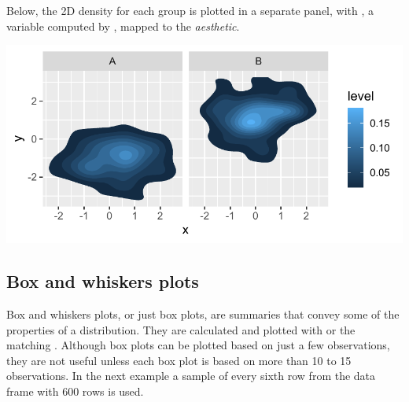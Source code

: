 \documentclass[krantz2]{krantz}\usepackage{knitr}
\begin{document}
Below, the 2D density for each group is plotted in a separate panel, with , a variable computed by , mapped to the  \emph{aesthetic}.



\begin{knitrout}\footnotesize
{}\color{fgcolor}\begin{kframe}
\begin{alltt}
\hlstd{(} 
        \hlstd{=} \hlstd{(}    \hlopt{+}
  \hlstd{(}\hlstd{(} \hlstd{=}   \hlstd{=} \hlstd{)} \hlopt{+}
  \hlstd{(} \hlstd{=} 
\end{alltt}
\end{kframe}

{\centering \includegraphics[width=.7\textwidth]{figure/pos-density-plot-12-1} 

}


\end{knitrout}



\subsection{Box and whiskers plots}\label{sec:boxplot}

Box and whiskers plots, or just box plots, are summaries that convey some of the properties of a distribution. They are calculated and plotted with  or the matching . Although box plots can be plotted based on just a few observations, they are not useful unless each box plot is based on more than 10 to 15 observations. In the next example a sample of every sixth row from the data frame  with 600 rows is used.
\end{document}
